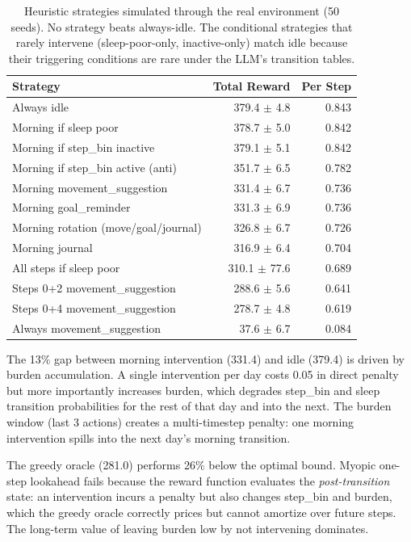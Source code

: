\documentclass[11pt]{article}
\begin{document}
\begin{table}[h]
\centering
\small
\begin{tabular}{lrr}
\toprule
Strategy & Total Reward & Per Step \\
\midrule
Always idle & 379.4 $\pm$ 4.8 & 0.843 \\
Morning if sleep poor & 378.7 $\pm$ 5.0 & 0.842 \\
Morning if step\_bin inactive & 379.1 $\pm$ 5.1 & 0.842 \\
Morning if step\_bin active (anti) & 351.7 $\pm$ 6.5 & 0.782 \\
Morning movement\_suggestion & 331.4 $\pm$ 6.7 & 0.736 \\
Morning goal\_reminder & 331.3 $\pm$ 6.9 & 0.736 \\
Morning rotation (move/goal/journal) & 326.8 $\pm$ 6.7 & 0.726 \\
Morning journal & 316.9 $\pm$ 6.4 & 0.704 \\
All steps if sleep poor & 310.1 $\pm$ 77.6 & 0.689 \\
Steps 0+2 movement\_suggestion & 288.6 $\pm$ 5.6 & 0.641 \\
Steps 0+4 movement\_suggestion & 278.7 $\pm$ 4.8 & 0.619 \\
Always movement\_suggestion & 37.6 $\pm$ 6.7 & 0.084 \\
\bottomrule
\end{tabular}
\caption{Heuristic strategies simulated through the real environment (50 seeds). No strategy beats always-idle. The conditional strategies that rarely intervene (sleep-poor-only, inactive-only) match idle because their triggering conditions are rare under the LLM's transition tables.}
\label{tab:heuristics}
\end{table}

The 13\% gap between morning intervention (331.4) and idle (379.4) is driven by burden accumulation. A single intervention per day costs 0.05 in direct penalty but more importantly increases burden, which degrades step\_bin and sleep transition probabilities for the rest of that day and into the next. The burden window (last 3 actions) creates a multi-timestep penalty: one morning intervention spills into the next day's morning transition.

The greedy oracle (281.0) performs 26\% below the optimal bound. Myopic one-step lookahead fails because the reward function evaluates the \emph{post-transition} state: an intervention incurs a penalty but also changes step\_bin and burden, which the greedy oracle correctly prices but cannot amortize over future steps. The long-term value of leaving burden low by not intervening dominates.
\end{document}
